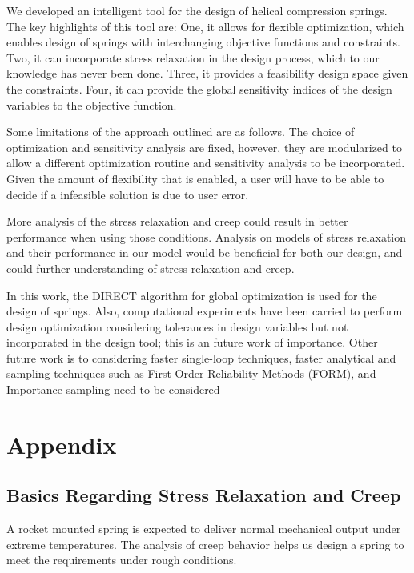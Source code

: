 \documentclass[10pt]{article}
\begin{document}
We developed an intelligent tool for the design of helical compression springs. The key highlights of this tool are: One, it allows for flexible optimization, which enables design of springs with interchanging objective functions and constraints. Two, it can incorporate stress relaxation in the design process, which to our knowledge has never been done. Three, it provides a feasibility design space given the constraints. Four, it can provide the global sensitivity indices of the design variables to the objective function. 

Some limitations of the approach outlined are as follows. The choice of optimization and sensitivity analysis are fixed, however, they are modularized to allow a different optimization routine and sensitivity analysis to be incorporated. Given the amount of flexibility that is enabled, a user will have to be able to decide if a infeasible solution is due to user error. 

More analysis of the stress relaxation and creep could result in better performance when using those conditions. Analysis on models of stress relaxation and their performance in our model would be beneficial for both our design, and could further understanding of stress relaxation and creep.

In this work, the DIRECT algorithm for global optimization is used for the design of springs. Also, computational experiments have been carried to perform design optimization considering tolerances in design variables but not incorporated in the design tool; this is an future work of importance. Other future work is to considering faster single-loop techniques, faster analytical and sampling techniques such as First Order Reliability Methods (FORM), and Importance sampling need to be considered

\section{Appendix}
\label{sec:Appendix}

\subsection{Basics Regarding Stress Relaxation and Creep}

A rocket mounted spring is expected to deliver normal mechanical output under extreme temperatures. The analysis of creep behavior helps us design a spring to meet the requirements under rough conditions.
\end{document}
